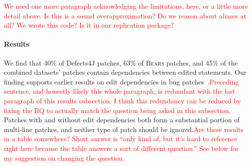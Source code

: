 \documentclass[10pt, conference]{IEEEtran}
\newcommand\todo[1]{\textcolor{red}{#1}}
\newcommand\bears{\textsc{Bears}\xspace}
\begin{document}
\todo{We need one more paragraph acknowledging the limitations, here, or a
  little more detail above. Is this is a sound overapproximation?  Do we reason
  about aliases at all?  We wrote this code? Is it in our replication package?}

\paragraph{Results}

We find that 40\% of Defects4J patches, 63\% of \bears patches, 
and 45\% of the combined datasets' patches contain dependencies 
between edited statements.
Our finding supports earlier results on edit dependencies in 
bug patches~\cite{zhong2015}.\todo{Preceding sentence, and honestly likely this
  whole paragraph, is redundant with the last paragraph of this results
  subsection.  I think this redundancy can be reduced by fixing the RQ to
  actually match the question being asked in this subsection.}
Patches with and without edit dependencies both form a substantial
portion of multi-line patches,
and neither type of patch should be ignored.\todo{Are these results in a table
  somewhere? Short answer is ``only kind of, but it's hard to reference right
  here because the table answers a sort of different question.'' See below for
  my suggestion on changing the question.}
\end{document}
